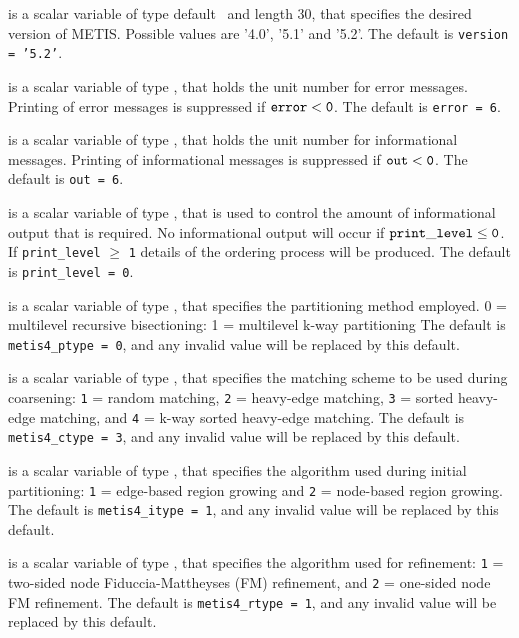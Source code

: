 \documentclass{galahad}
\begin{document}
\begin{description}

 is a scalar variable of type default \character\
and length 30, that specifies the desired version of METIS. Possible
values are '4.0', '5.1' and '5.2'.
The default is {\tt version = '5.2'}.

 is a scalar variable of type \integer, that holds the
unit number for error messages.
Printing of error messages is suppressed if ${\tt error} < {\tt 0}$.
The default is {\tt error = 6}.

 is a scalar variable of type \integer, that holds the
unit number for informational messages.
Printing of informational messages is suppressed if ${\tt out} < {\tt 0}$.
The default is {\tt out = 6}.

 is a scalar variable of type \integer,
that is used
to control the amount of informational output that is required. No
informational output will occur if ${\tt print\_level} \leq {\tt 0}$. If
{\tt print\_level} $\geq$ {\tt 1} details of the ordering process will 
be produced. The default is {\tt print\_level = 0}.

 is a scalar variable of type \integer, that specifies
the partitioning method employed. 0 = multilevel recursive bisectioning:
 1 = multilevel k-way partitioning
The default is {\tt metis4\_ptype = 0}, and any invalid value will be
replaced by this default.

 is a scalar variable of type \integer, that specifies
the matching scheme to be used during coarsening: {\tt 1} = random matching, 
 {\tt 2} = heavy-edge matching, {\tt 3} = sorted heavy-edge matching, and
 {\tt 4} = k-way sorted heavy-edge matching.
The default is {\tt metis4\_ctype = 3}, and any invalid value will be
replaced by this default.

 is a scalar variable of type \integer, that specifies
the algorithm used during initial partitioning: 
 {\tt 1} = edge-based region growing and {\tt 2} = node-based region growing.
The default is {\tt metis4\_itype = 1}, and any invalid value will be
replaced by this default.

 is a scalar variable of type \integer, that specifies
the algorithm used for refinement: 
 {\tt 1} = two-sided node Fiduccia-Mattheyses (FM) refinement, and
 {\tt 2} = one-sided node FM refinement.
The default is {\tt metis4\_rtype = 1}, and any invalid value will be
replaced by this default.


\end{description}
\end{document}
